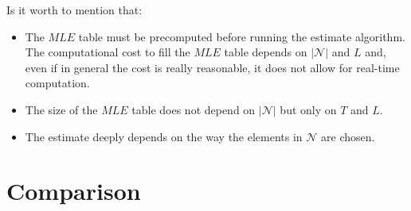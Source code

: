 \documentclass[12pt,a4paper]{report}
\begin{document}
Is it worth to mention that:
\begin{itemize}
\item  The $MLE$ table must be precomputed before running the estimate algorithm. The computational cost to fill the $MLE$ table depends on $|\mathcal{N}|$ and $L$ and, even if in general the cost is really reasonable, it does not allow for real-time computation.
\item The size of the $MLE$ table does not depend on $|\mathcal{N}|$ but only on $T$ and $L$.
\item The estimate deeply depends on the way the elements in $\mathcal{N}$ are chosen. 
\end{itemize}

\chapter{Comparison}
\label{ch:Comparison}
\end{document}
